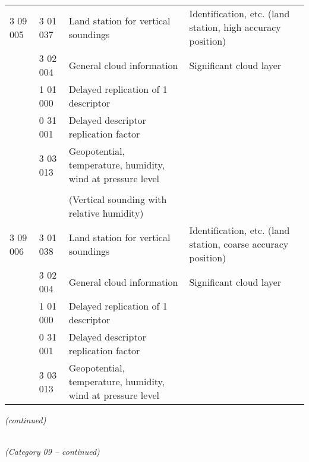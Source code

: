 \begin{longtable}[]{@{}llll@{}}
3 09 005 & 3 01 037 & Land station for vertical soundings & Identification, etc. (land station, high accuracy position)\tabularnewline
& 3 02 004 & General cloud information & Significant cloud layer\tabularnewline
& 1 01 000 & Delayed replication of 1 descriptor &\tabularnewline
& 0 31 001 & Delayed descriptor replication factor &\tabularnewline
& 3 03 013 & Geopotential, temperature, humidity, wind at pressure level &\tabularnewline
& & &\tabularnewline
& & (Vertical sounding with relative humidity) &\tabularnewline
3 09 006 & 3 01 038 & Land station for vertical soundings & Identification, etc. (land station, coarse accuracy position)\tabularnewline
& 3 02 004 & General cloud information & Significant cloud layer\tabularnewline
& 1 01 000 & Delayed replication of 1 descriptor &\tabularnewline
& 0 31 001 & Delayed descriptor replication factor &\tabularnewline
& 3 03 013 & Geopotential, temperature, humidity, wind at pressure level &\tabularnewline
\bottomrule
\end{longtable}

\emph{(continued)}

\emph{\\
(Category 09 -- continued)}

